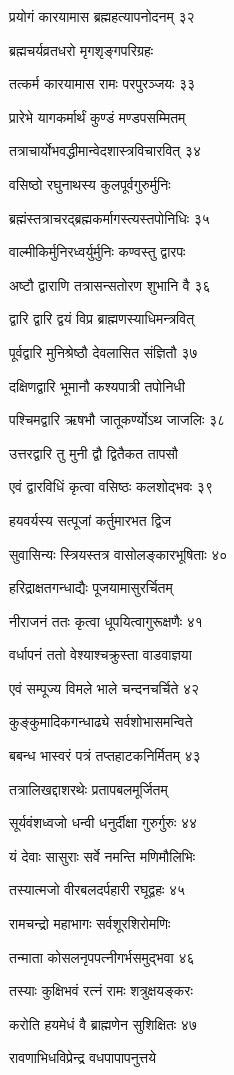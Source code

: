 प्रयोगं कारयामास ब्रह्महत्यापनोदनम् ३२

ब्रह्मचर्यव्रतधरो मृगशृङ्गपरिग्रहः

तत्कर्म कारयामास रामः परपुरञ्जयः ३३

प्रारेभे यागकर्मार्थं कुण्डं मण्डपसम्मितम्

तत्राचार्योभवद्धीमान्वेदशास्त्रविचारवित् ३४

वसिष्ठो रघुनाथस्य कुलपूर्वगुरुर्मुनिः

ब्रह्मंस्तत्राचरद्ब्रह्मकर्मागस्त्यस्तपोनिधिः ३५

वाल्मीकिर्मुनिरध्वर्युर्मुनिः कण्वस्तु द्वारपः

अष्टौ द्वाराणि तत्रासन्सतोरण शुभानि वै ३६

द्वारि द्वारि द्वयं विप्र ब्राह्मणस्याधिमन्त्रवित्

पूर्वद्वारि मुनिश्रेष्ठौ देवलासित संज्ञितौ ३७

दक्षिणद्वारि भूमानौ कश्यपात्री तपोनिधी

पश्चिमद्वारि ऋषभौ जातूकर्ण्योऽथ जाजलिः ३८

उत्तरद्वारि तु मुनी द्वौ द्वितैकत तापसौ

एवं द्वारविधिं कृत्वा वसिष्ठः कलशोद्भवः ३९

हयवर्यस्य सत्पूजां कर्तुमारभत द्विज

सुवासिन्यः स्त्रियस्तत्र वासोलङ्कारभूषिताः ४०

हरिद्राक्षतगन्धाद्यैः पूजयामासुरर्चितम्

नीराजनं ततः कृत्वा धूपयित्वागुरूक्षणैः ४१

वर्धापनं ततो वेश्याश्चक्रुस्ता वाडवाज्ञया

एवं सम्पूज्य विमले भाले चन्दनचर्चिते ४२

कुङ्कुमादिकगन्धाढ्ये सर्वशोभासमन्विते

बबन्ध भास्वरं पत्रं तप्तहाटकनिर्मितम् ४३

तत्रालिखद्दाशरथेः प्रतापबलमूर्जितम्

सूर्यवंशध्वजो धन्वी धनुर्दीक्षा गुरुर्गुरुः ४४

यं देवाः सासुराः सर्वे नमन्ति मणिमौलिभिः

तस्यात्मजो वीरबलदर्पहारी रघूद्वहः ४५

रामचन्द्रो महाभागः सर्वशूरशिरोमणिः

तन्माता कोसलनृपपत्नीगर्भसमुद्भवा ४६

तस्याः कुक्षिभवं रत्नं रामः शत्रुक्षयङ्करः

करोति हयमेधं वै ब्राह्मणेन सुशिक्षितः ४७

रावणाभिधविप्रेन्द्र वधपापापनुत्तये

